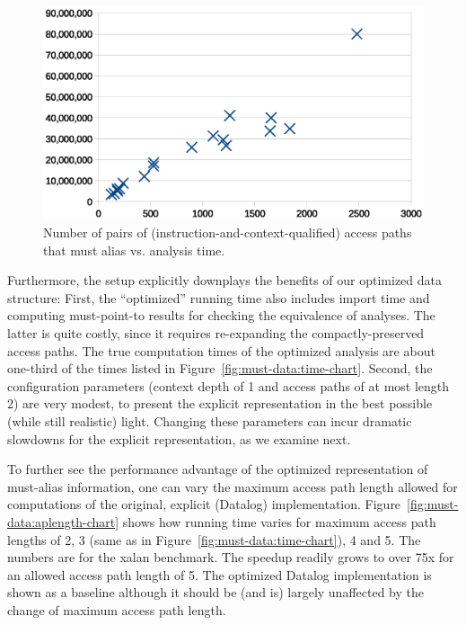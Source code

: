 \begin{figure}[htp]
\centering
\includegraphics[clip,width=\linewidth]{assets/must-data/pairs.eps}
\caption{Number of pairs of (instruction-and-context-qualified) access paths that must alias vs. analysis time.}
\label{fig:must-data:pairs-chart}
\end{figure}

Furthermore, the setup explicitly downplays the benefits of our optimized data structure: First, the ``optimized'' running time also includes import time and computing must-point-to results for checking the equivalence of analyses. The latter is quite costly, since it requires re-expanding the compactly-preserved access paths. The true computation times of the optimized analysis are about one-third of the times listed in Figure~\ref{fig:must-data:time-chart}. Second, the configuration parameters (context depth of 1 and access paths of at most length 2) are very modest, to present the explicit representation in the best possible (while still realistic) light. Changing these parameters can incur dramatic slowdowns for the explicit representation, as we examine next.


To further see the performance advantage of the optimized representation of must-alias information, one can vary the maximum access path length allowed for computations of the original, explicit (Datalog) implementation. Figure~\ref{fig:must-data:aplength-chart} shows how running time varies for maximum access path lengths of 2, 3 (same as in Figure~\ref{fig:must-data:time-chart}), 4 and 5. The numbers are for the xalan benchmark. The speedup readily grows to over 75x for an allowed access path length of 5. The optimized Datalog implementation is shown as a baseline although it should be (and is) largely unaffected by the change of maximum access path length.

